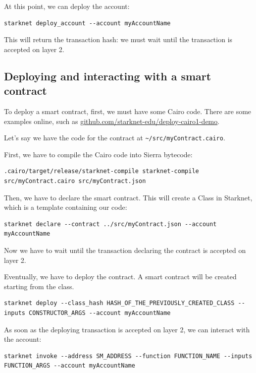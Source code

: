 \documentclass[12pt]{article}
\begin{document}
At this point, we can deploy the account:
\begin{lstlisting}[language=terminal]
    starknet deploy_account --account myAccountName
\end{lstlisting}

This will return the transaction hash: we must wait until the transaction is accepted on layer 2.

\subsection{Deploying and interacting with a smart contract} \label{subsubsection:daiwasc}
To deploy a smart contract, first, we must have some Cairo code. There are some examples online, such as \url{github.com/starknet-edu/deploy-cairo1-demo}.

Let's say we have the code for the contract at \verb|~/src/myContract.cairo|.

First, we have to compile the Cairo code into Sierra bytecode:
\begin{lstlisting}[language=terminal]
    .cairo/target/release/starknet-compile starknet-compile src/myContract.cairo src/myContract.json
\end{lstlisting}

Then, we have to declare the smart contract. This will create a Class in Starknet, which is a template containing our code:
\begin{lstlisting}[language=terminal]
    starknet declare --contract ../src/myContract.json --account myAccountName
\end{lstlisting}

Now we have to wait until the transaction declaring the contract is accepted on layer 2.

Eventually, we have to deploy the contract. A smart contract will be created starting from the class.
\begin{lstlisting}[language=terminal]
    starknet deploy --class_hash HASH_OF_THE_PREVIOUSLY_CREATED_CLASS --inputs CONSTRUCTOR_ARGS --account myAccountName
\end{lstlisting}

As soon as the deploying transaction is accepted on layer 2, we can interact with the account:
\begin{lstlisting}[language=terminal]
    starknet invoke --address SM_ADDRESS --function FUNCTION_NAME --inputs FUNCTION_ARGS --account myAccountName
\end{lstlisting}
\end{document}
